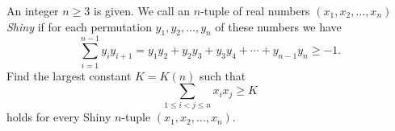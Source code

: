 An integer $n\geq3$ is given. We call an $n$-tuple of real numbers $\left(x_1,x_2,\ldots,x_n\right)$ \emph{Shiny} if for each permutation $y_1,y_2,\ldots,y_n$ of these numbers we have \[\displaystyle\sum_{i=1}^{n-1}y_iy_{i+1}=y_1y_2+y_2y_3+y_3y_4+\cdots+y_{n-1}y_n\geq-1.\] Find the largest constant $K=K\left(n\right)$ such that \[\displaystyle\sum_{1\leq i<j\leq n}x_ix_j\geq K\] holds for every Shiny $n$-tuple $\left(x_1,x_2,\ldots,x_n\right)$.